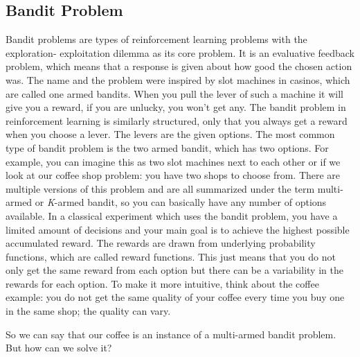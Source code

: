 \subsection{Bandit Problem}
Bandit problems are types of reinforcement learning problems with the exploration- exploitation dilemma as its core problem. It is an evaluative feedback problem, which means that a response is given about how good the chosen action was. The name and the problem were inspired by slot machines in casinos, which are called one armed bandits. When you pull the lever of such a machine it will give you a reward, if you are unlucky, you won't get any. The bandit problem in reinforcement learning is similarly structured, only that you always get a reward when you choose a lever. The levers are the given options. The most common type of bandit problem is the two armed bandit, which has two options. For example, you can imagine this as two slot machines next to each other or if we look at our coffee shop problem: you have two shops to choose from.
There are multiple versions of this problem and are all summarized under the term multi-armed or \textit{K}-armed bandit, so you can basically have any number of options available. 
In a classical experiment which uses the bandit problem, you have a limited amount of decisions and your main goal is to achieve the highest possible accumulated reward. The rewards are drawn from underlying probability functions, which are called reward functions. This just means that you do not only get the same reward from each option but there can be a variability in the rewards for each option. To make it more intuitive, think about the coffee example: you do not get the same quality of your coffee every time you buy one in the same shop; the quality can vary.

So we can say that our coffee is an instance of a multi-armed bandit problem. But how can we solve it? 

